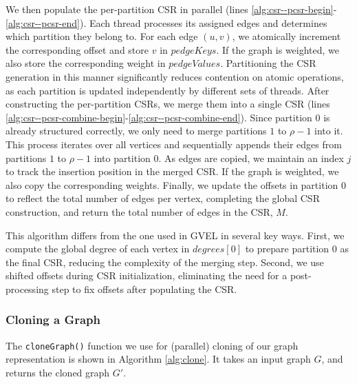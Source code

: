 We then populate the per-partition CSR in parallel (lines \ref{alg:csr--pcsr-begin}-\ref{alg:csr--pcsr-end}). Each thread processes its assigned edges and determines which partition they belong to. For each edge $(u, v)$, we atomically increment the corresponding offset and store $v$ in $pedgeKeys$. If the graph is weighted, we also store the corresponding weight in $pedgeValues$. Partitioning the CSR generation in this manner significantly reduces contention on atomic operations, as each partition is updated independently by different sets of threads.
%
After constructing the per-partition CSRs, we merge them into a single CSR (lines \ref{alg:csr--pcsr-combine-begin}-\ref{alg:csr--pcsr-combine-end}). Since partition $0$ is already structured correctly, we only need to merge partitions $1$ to $\rho-1$ into it. This process iterates over all vertices and sequentially appends their edges from partitions $1$ to $\rho-1$ into partition $0$. As edges are copied, we maintain an index $j$ to track the insertion position in the merged CSR. If the graph is weighted, we also copy the corresponding weights. Finally, we update the offsets in partition $0$ to reflect the total number of edges per vertex, completing the global CSR construction, and return the total number of edges in the CSR, $M$.

This algorithm differs from the one used in GVEL \cite{sahu2023gvel} in several key ways. First, we compute the global degree of each vertex in $degrees[0]$ to prepare partition $0$ as the final CSR, reducing the complexity of the merging step. Second, we use shifted offsets during CSR initialization, eliminating the need for a post-processing step to fix offsets after populating the CSR.




\subsubsection{Cloning a Graph}
\label{sec:clone}

The \texttt{cloneGraph()} function we use for (parallel) cloning of our graph representation is shown in Algorithm \ref{alg:clone}. It takes an input graph $G$, and returns the cloned graph $G'$.

